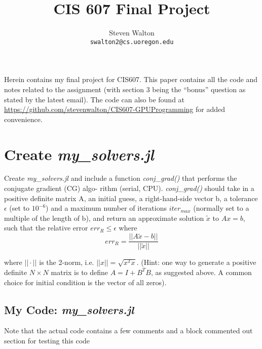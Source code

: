 \documentclass{article}
\title{CIS 607 Final Project}
\author{%
    Steven Walton\\
  \texttt{swalton2@cs.uoregon.edu} \\
}
\begin{document}
\maketitle


Herein contains my final project for CIS607. This paper contains all the code
and notes related to the assignment (with section 3 being the ``bonus'' question
as stated by the latest email). The code can also be found at
\url{https://github.com/stevenwalton/CIS607-GPUProgramming} for added convenience.

\section{Create \textit{my\_solvers.jl}}

Create \textit{my\_solvers.jl} and include a function \textit{conj\_grad()} that
performs the conjugate gradient (CG) algo- rithm (serial, CPU).
\textit{conj\_grad()} should take in a positive definite matrix A, an initial
guess, a right-hand-side vector b, a tolerance  $\epsilon$ (set to $10^{-6}$)
and a maximum number of iterations $iter_{max}$ (normally set to a multiple of the
length of b), and return an approximate solution $\tilde{x}$ to $Ax = b$, such
that the relative error $err_R \leq \epsilon$ where
\[
    err_R = \frac{||A\tilde x - b||}{||\tilde x||}
\]

where $||\cdot||$ is the 2-norm, i.e. $||x|| = \sqrt{x^T x}$. (Hint: one way to
generate a positive definite $N \times N$ matrix is to define $A = I + B^T B$,
as suggested above. A common choice for initial condition is the vector of all
zeros).

\subsection{My Code: \textit{my\_solvers.jl}}
Note that the actual code contains a few comments and a block commented out
section for testing this code
\end{document}
